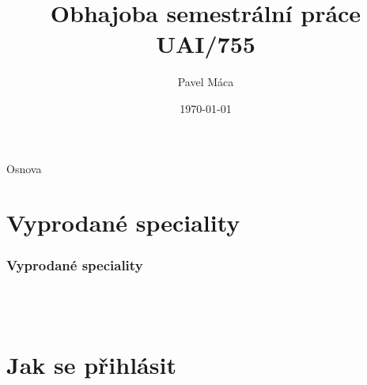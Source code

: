 \documentclass[slidestop]{beamer}
\begin{document}
\title{Obhajoba semestrální práce UAI/755}
\author{Pavel Máca}
\date{\today}
\begin{frame}
\titlepage
\end{frame}
\begin{frame}{Osnova}
\tableofcontents
\end{frame}
\section{Vyprodané speciality}
\begin{frame}
\frametitle{Vyprodané speciality}
\begin{figure}[h] %
\begin{center}
\\~\\
\end{center}
\end{figure}
\end{frame}
\section{Jak se přihlásit}
\end{document}
